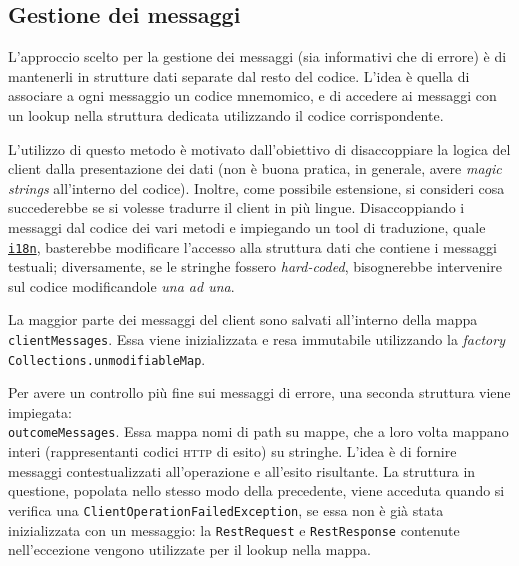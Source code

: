 \documentclass[a4paper,8pt]{article} %
\def\code#1{\texttt{#1}}
\begin{document}
\subsection{Gestione dei messaggi}
\label{sec:err_handling}
L'approccio scelto per la gestione dei messaggi (sia informativi che di errore) è di mantenerli in strutture dati separate dal resto del codice.
L'idea è quella di associare a ogni messaggio un codice mnemomico, e di accedere ai messaggi con un lookup nella struttura dedicata utilizzando il codice corrispondente.
\par L'utilizzo di questo metodo è motivato dall'obiettivo di disaccoppiare la logica del client dalla presentazione dei dati (non è buona pratica, in generale, avere \emph{magic strings} all'interno del codice). Inoltre,
come possibile estensione, si consideri cosa succederebbe se si volesse tradurre il client in più lingue. Disaccoppiando i messaggi dal codice dei vari metodi e impiegando un tool di traduzione, quale \href{https://docs.oracle.com/javase/8/docs/technotes/guides/intl/index.html}{\code{i18n}},
basterebbe modificare l'accesso alla struttura dati che contiene i messaggi testuali; diversamente, se le stringhe fossero \emph{hard-coded}, bisognerebbe intervenire sul codice modificandole \emph{una ad una}.
\par La maggior parte dei messaggi del client sono salvati all'interno della mappa \code{clientMessages}. Essa viene inizializzata e resa immutabile utilizzando la \emph{factory} \code{Collections.unmodifiableMap}.
\par Per avere un controllo più fine sui messaggi di errore, una seconda struttura viene impiegata: \\ \code{outcomeMessages}. Essa mappa nomi di path su mappe, che a loro volta mappano interi
(rappresentanti codici \textsc{http} di esito) su stringhe. L'idea è di fornire messaggi contestualizzati all'operazione e all'esito risultante.
La struttura in questione, popolata nello stesso modo della precedente, viene acceduta quando si verifica una \code{ClientOperationFailedException}, se essa non è già stata inizializzata con un messaggio: la \code{RestRequest} e \code{RestResponse} contenute nell'eccezione vengono utilizzate per il lookup nella mappa.
\end{document}
